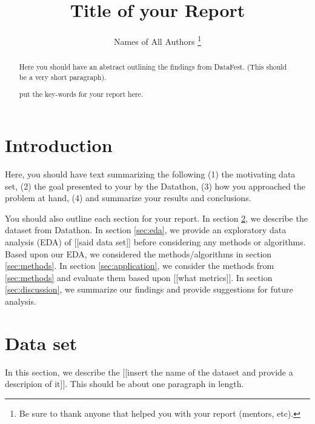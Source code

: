 \documentclass[11pt]{llncs}\usepackage[]{graphicx}\usepackage[]{color}
\newcommand{\keywords}[1]{\par\addvspace\baselineskip
\noindent\keywordname\enspace\ignorespaces#1}
\begin{document}
\mainmatter  %
\title{Title of your Report}


\author{Names of All Authors
  \thanks{Be sure to thank anyone that helped you with your report (mentors, etc).}
 }



\maketitle


\begin{abstract}
Here you should have an abstract outlining the findings from DataFest. (This should be a very short paragraph).

\keywords{put the key-words for your report here.}
\end{abstract}



\section{Introduction}
\label{sec:introduction}
Here, you should have text summarizing the following (1) the motivating data set, (2) the goal presented to your by the Datathon, (3) how you approached the problem at hand, (4) and summarize your results and conclusions.

You should also outline each section for your report. In section \ref{sec:datset}, we describe the dataset from Datathon. In section \ref{sec:eda}, we provide an exploratory data analysis (EDA) of [[said data set]] before considering any methods or algorithms. Based upon our EDA, we considered the methods/algorithms in section \ref{sec:methods}. In section \ref{sec:application}, we consider the methods from \ref{sec:methods} and evaluate them based upon [[what metrics]]. In section \ref{sec:discussion}, we summarize our findings and provide suggestions for future analysis.

\section{Data set}
\label{sec:datset}
In this section, we describe the [[insert the name of the dataset and provide a descripion of it]]. This should be about one paragraph in length.
\end{document}
